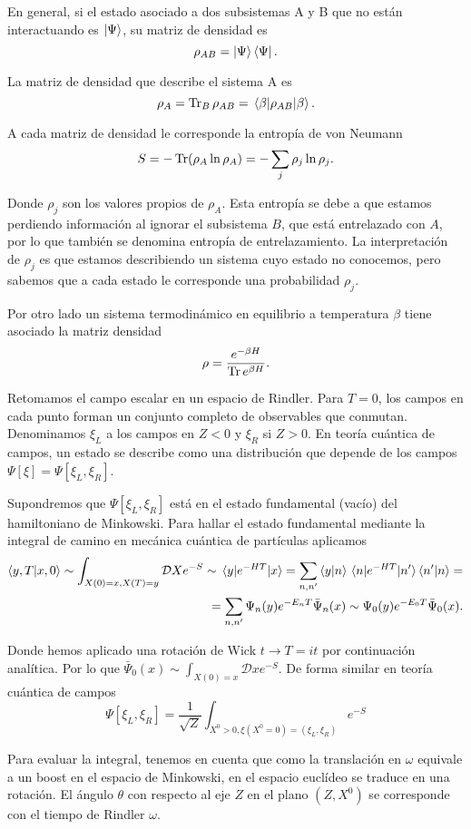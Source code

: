 En general, si el estado asociado a dos subsistemas A y B que no están interactuando 
es $\ket{\Psi}$, su matriz de densidad es
\begin{equation}
  \rho_{AB}=\ket{\Psi}\bra{\Psi}.
\end{equation}

La matriz de densidad que describe el sistema A es
\begin{equation}
  \rho_{A}=\Tr_B \rho_{AB}=\expval{\rho_{AB}}{\beta}.
\end{equation}
 
A cada matriz de densidad le corresponde la entropía de von Neumann
\begin{equation}
  S=-\Tr (\rho_A \ln \rho_A)=-\sum_j \rho_j \ln \rho_j.
\end{equation}

Donde $\rho_j$ son los valores propios de $\rho_A$.
Esta entropía se debe a que estamos perdiendo información al ignorar el subsistema $B$, que 
está entrelazado con $A$, por lo que también se denomina entropía de entrelazamiento.
La interpretación de $\rho_j$ es que estamos describiendo un sistema cuyo estado no 
conocemos, pero sabemos que a cada estado le corresponde una probabilidad $\rho_j$.

Por otro lado un sistema termodinámico en equilibrio a temperatura $\beta$ tiene 
asociado la matriz densidad 
\begin{equation}
  \rho=\frac{e^{-\beta H}}{\Tr e^{\beta H}}.
\end{equation}

Retomamos el campo escalar en un espacio de Rindler. 
Para $T=0$, los campos en cada punto forman un conjunto completo de observables que 
conmutan. Denominamos $\xi_L$ a los campos en $Z<0$ y $\xi_R$ si $Z>0$.
En teoría cuántica de campos, un estado se describe como una distribución que 
depende de los campos $\Psi[\xi]=\Psi[\xi_L,\xi_R]$.

Supondremos que $\Psi[\xi_L,\xi_R]$ está en el estado fundamental (vacío) del hamiltoniano
de Minkowski. Para hallar el estado fundamental mediante la integral de camino 
en mecánica cuántica de partículas aplicamos
\begin{align}
  \braket{y,T}{x,0}\sim \int_{X(0)=x,X(T)=y} \mathcal D X e^{-S} \sim 
  \mel{y}{e^{-HT}}{x}=\sum_{n,n'} \ip{y}{n}\mel{n}{e^{-HT}}{n'}\ip{n'}{n}=\\
  =\sum_{n,n'} \Psi_n(y) e^{-E_n T} \bar{\Psi}_n(x)\sim   \Psi_0(y) e^{-E_0 T} \bar{\Psi}_0(x).
\end{align}

Donde hemos aplicado una rotación de Wick $t\to T=it$ por continuación analítica.
Por lo que $\bar{\Psi}_0(x)\sim \int_{X(0)=x} \mathcal D x e^{-S}$.
De forma similar en teoría cuántica de campos 
\begin{equation}
  \Psi[\xi_L,\xi_R]=\frac{1}{\sqrt{Z}}\int_{X^0>0, \xi(X^0=0)=(\xi_L,\xi_R)} e^{-S}
\end{equation}

Para evaluar la integral, tenemos en cuenta que como la translación en $\omega$
equivale a un boost en el espacio de Minkowski, en el espacio euclídeo se traduce
en una rotación.
El ángulo $\theta$ con respecto al eje $Z$ en el plano $(Z,X^0)$ se corresponde con
el tiempo de Rindler $\omega$.
